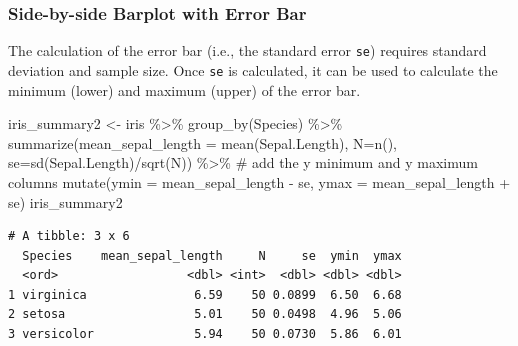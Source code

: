 \documentclass[
  letterpaper,
]{book}
\newenvironment{Shaded}{\begin{snugshade}}{\end{snugshade}}
\newcommand{\AttributeTok}[1]{\textcolor[rgb]{0.40,0.45,0.13}{#1}}
\newcommand{\CommentTok}[1]{\textcolor[rgb]{0.37,0.37,0.37}{#1}}
\newcommand{\FunctionTok}[1]{\textcolor[rgb]{0.28,0.35,0.67}{#1}}
\newcommand{\NormalTok}[1]{\textcolor[rgb]{0.00,0.23,0.31}{#1}}
\newcommand{\OtherTok}[1]{\textcolor[rgb]{0.00,0.23,0.31}{#1}}
\newcommand{\SpecialCharTok}[1]{\textcolor[rgb]{0.37,0.37,0.37}{#1}}
\begin{document}
\subsubsection{Side-by-side Barplot with Error
Bar}\label{ggplot-error-bar}

The calculation of the error bar (i.e., the standard error \texttt{se})
requires standard deviation and sample size. Once \texttt{se} is
calculated, it can be used to calculate the minimum (lower) and maximum
(upper) of the error bar.

\begin{Shaded}
\begin{Highlighting}[]
\NormalTok{iris\_summary2 }\OtherTok{\textless{}{-}}\NormalTok{ iris }\SpecialCharTok{\%\textgreater{}\%}
                  \FunctionTok{group\_by}\NormalTok{(Species) }\SpecialCharTok{\%\textgreater{}\%}
                  \FunctionTok{summarize}\NormalTok{(}\AttributeTok{mean\_sepal\_length =} \FunctionTok{mean}\NormalTok{(Sepal.Length),}
                            \AttributeTok{N=}\FunctionTok{n}\NormalTok{(),}
                            \AttributeTok{se=}\FunctionTok{sd}\NormalTok{(Sepal.Length)}\SpecialCharTok{/}\FunctionTok{sqrt}\NormalTok{(N)) }\SpecialCharTok{\%\textgreater{}\%}
                  \CommentTok{\# add the y minimum and y maximum columns}
                  \FunctionTok{mutate}\NormalTok{(}\AttributeTok{ymin =}\NormalTok{ mean\_sepal\_length }\SpecialCharTok{{-}}\NormalTok{ se,}
                         \AttributeTok{ymax =}\NormalTok{ mean\_sepal\_length }\SpecialCharTok{+}\NormalTok{ se)}
\NormalTok{iris\_summary2}
\end{Highlighting}
\end{Shaded}

\begin{verbatim}
# A tibble: 3 x 6
  Species    mean_sepal_length     N     se  ymin  ymax
  <ord>                  <dbl> <int>  <dbl> <dbl> <dbl>
1 virginica               6.59    50 0.0899  6.50  6.68
2 setosa                  5.01    50 0.0498  4.96  5.06
3 versicolor              5.94    50 0.0730  5.86  6.01
\end{verbatim}
\end{document}
